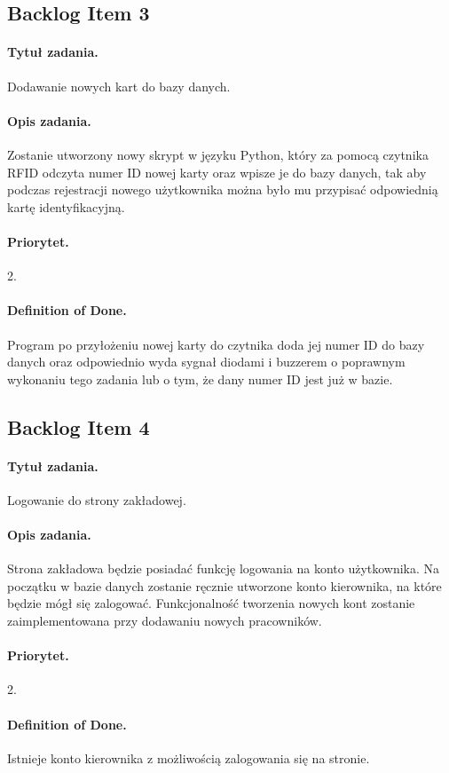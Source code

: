 \documentclass[a4paper]{article}
\begin{document}
\subsection{Backlog Item 3}
\paragraph{Tytuł zadania.} Dodawanie nowych kart do bazy danych.
\paragraph{Opis zadania.} Zostanie utworzony nowy skrypt w języku Python, który za pomocą czytnika RFID odczyta numer ID nowej karty oraz wpisze je do bazy danych, tak aby podczas rejestracji nowego użytkownika można było mu przypisać odpowiednią kartę identyfikacyjną. 
\paragraph{Priorytet.} 2.
\paragraph{Definition of Done.} Program po przyłożeniu nowej karty do czytnika doda jej numer ID do bazy danych oraz odpowiednio wyda sygnał diodami i buzzerem o poprawnym wykonaniu tego zadania lub o tym, że dany numer ID jest już w bazie.

\subsection{Backlog Item 4}
\paragraph{Tytuł zadania.} Logowanie do strony zakładowej.
\paragraph{Opis zadania.} Strona zakładowa będzie posiadać funkcję logowania na konto użytkownika. Na początku w bazie danych zostanie ręcznie utworzone konto kierownika, na które będzie mógł się zalogować. Funkcjonalność tworzenia nowych kont zostanie zaimplementowana przy dodawaniu nowych pracowników.
\paragraph{Priorytet.} 2.
\paragraph{Definition of Done.} Istnieje konto kierownika z możliwością zalogowania się na stronie.
\end{document}
